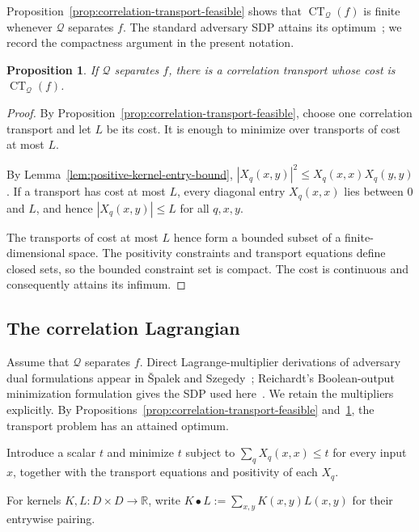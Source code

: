 \documentclass[11pt]{article}
\numberwithin{equation}{section}
\newtheorem{proposition}[definition]{Proposition}
\theoremstyle{remark}
\begin{document}
Proposition~\ref{prop:correlation-transport-feasible} shows that $\operatorname{CT}_{\mathcal Q}(f)$ is finite whenever $\mathcal Q$ separates $f$. The standard adversary SDP attains its optimum~\cite{Reichardt2009,LeeMittalReichardtSpalekSzegedy2011}; we record the compactness argument in the present notation.

\begin{proposition}
\label{prop:correlation-transport-attainment}
If $\mathcal Q$ separates $f$, there is a correlation transport whose cost
is $\operatorname{CT}_{\mathcal Q}(f)$.
\end{proposition}

\begin{proof}
By Proposition~\ref{prop:correlation-transport-feasible}, choose one
correlation transport and let $L$ be its cost. It is enough to minimize over
transports of cost at most $L$.

By Lemma~\ref{lem:positive-kernel-entry-bound},
$|X_q(x,y)|^2\leq X_q(x,x)X_q(y,y)$. If a transport has cost at most $L$, every diagonal entry $X_q(x,x)$ lies between $0$ and $L$, and hence $|X_q(x,y)|\leq L$ for all $q,x,y$.

The transports of cost at most $L$ hence form a bounded subset of a
finite-dimensional space. The positivity constraints and transport equations define closed sets, so the bounded constraint set is compact. The cost is continuous and consequently
attains its infimum.
\end{proof}


\subsection{The correlation Lagrangian}
\label{subsec:correlation-lagrangian}

Assume that $\mathcal Q$ separates $f$. Direct Lagrange-multiplier derivations of adversary dual formulations appear in \v Spalek and Szegedy~\cite{SpalekSzegedy2006}; Reichardt's Boolean-output minimization formulation gives the SDP used here~\cite{Reichardt2009}. We retain the multipliers explicitly. By Propositions~\ref{prop:correlation-transport-feasible} and~\ref{prop:correlation-transport-attainment}, the transport problem has an attained optimum.

Introduce a scalar $t$ and minimize $t$ subject to
$\sum_qX_q(x,x)\leq t$ for every input $x$, together with the transport
equations and positivity of each $X_q$.

For kernels $K,L:D\times D\to\mathbb R$, write
$K\mathbin{\bullet}L:=\sum_{x,y}K(x,y)L(x,y)$ for their entrywise pairing.
\end{document}
